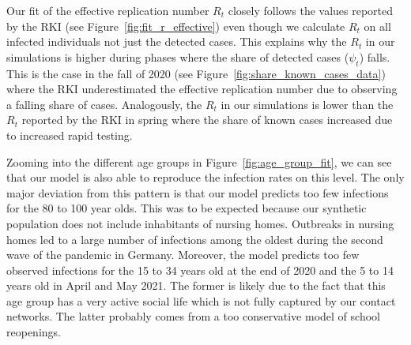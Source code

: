 \begin{figure}[ht]
\end{figure}

Our fit of the effective replication number $R_t$ closely follows the values reported by
the RKI (see Figure~\ref{fig:fit_r_effective}) even though we calculate $R_t$ on all
infected individuals not just the detected cases. This explains why the $R_t$ in our
simulations is higher during phases where the share of detected cases ($\psi_t$) falls.
This is the case in the fall of 2020 (see Figure~\ref{fig:share_known_cases_data}) where
the RKI underestimated the effective replication number due to observing a falling share
of cases. Analogously, the $R_t$ in our simulations is lower than the $R_t$ reported by
the RKI in spring where the share of known cases increased due to increased rapid
testing.

\FloatBarrier

Zooming into the different age groups in Figure~\ref{fig:age_group_fit}, we can see that
our model is also able to reproduce the infection rates on this level. The only major
deviation from this pattern is that our model predicts too few infections for the 80 to
100 year olds. This was to be expected because our synthetic population does not include
inhabitants of nursing homes. Outbreaks in nursing homes led to a large number of
infections among the oldest during the second wave of the pandemic in Germany. Moreover,
the model predicts too few observed infections for the 15 to 34 years old at the end of
2020 and the 5 to 14 years old in April and May 2021. The former is likely due to the
fact that this age group has a very active social life which is not fully captured by
our contact networks. The latter probably comes from a too conservative model of school
reopenings.


